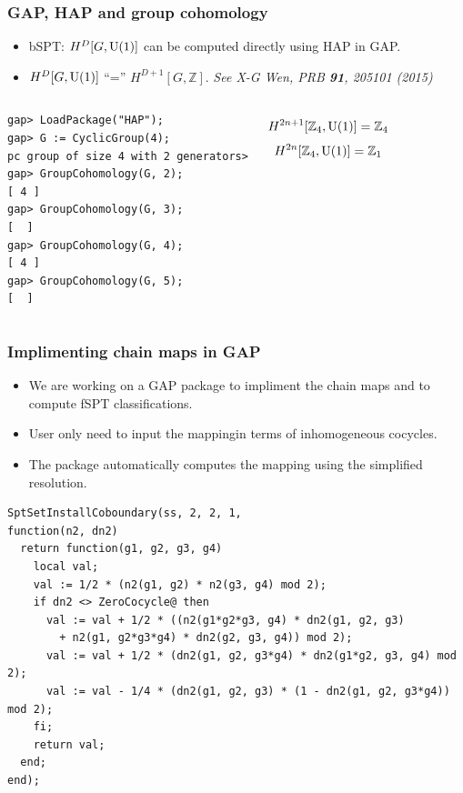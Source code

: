 \documentclass[xcolor=table, aspectratio=169,ignorenonframetext]{beamer}
\newcommand{\uone}{\text U(1)}
\begin{document}
\begin{frame}[fragile]
	\frametitle{GAP, HAP and group cohomology}
	\begin{itemize}
		\item bSPT: $H^D[G,\uone]$ can be computed directly using HAP in GAP.
		\item $H^D[G,\uone]$ ``='' $H^{D+1}[G,\mathbb Z]$. \emph{See X-G Wen, PRB \textbf{91}, 205101 (2015)}
	\end{itemize}
	\begin{columns}
	\begin{lstlisting}[basicstyle=\footnotesize]
gap> LoadPackage("HAP");
gap> G := CyclicGroup(4);
pc group of size 4 with 2 generators>
gap> GroupCohomology(G, 2);
[ 4 ]
gap> GroupCohomology(G, 3);
[  ]
gap> GroupCohomology(G, 4);
[ 4 ]
gap> GroupCohomology(G, 5);
[  ]
\end{lstlisting}
	\[H^{2n+1}[\mathbb Z_4,\uone] = \mathbb Z_4\]
	\[H^{2n}[\mathbb Z_4,\uone] = \mathbb Z_1\]
	\end{columns}
\end{frame}

\begin{frame}[fragile]
	\frametitle{Implimenting chain maps in GAP}
	\begin{itemize}
		\item We are working on a GAP package to impliment the chain maps and to compute fSPT classifications.
		\item User only need to input the mappingin terms of inhomogeneous cocycles.
		\item The package automatically computes the mapping using the simplified resolution.
	\end{itemize}
\begin{lstlisting}[basicstyle=\footnotesize,morekeywords={function,return,local,if,fi,then,end},showspaces=false,showtabs=false, keywordstyle=\color{blue}]
SptSetInstallCoboundary(ss, 2, 2, 1,
function(n2, dn2)
  return function(g1, g2, g3, g4)
    local val;
    val := 1/2 * (n2(g1, g2) * n2(g3, g4) mod 2);
    if dn2 <> ZeroCocycle@ then
      val := val + 1/2 * ((n2(g1*g2*g3, g4) * dn2(g1, g2, g3)
        + n2(g1, g2*g3*g4) * dn2(g2, g3, g4)) mod 2);
      val := val + 1/2 * (dn2(g1, g2, g3*g4) * dn2(g1*g2, g3, g4) mod 2);
      val := val - 1/4 * (dn2(g1, g2, g3) * (1 - dn2(g1, g2, g3*g4)) mod 2);
    fi;
    return val;
  end;
end);
\end{lstlisting}
\end{frame}
\end{document}
